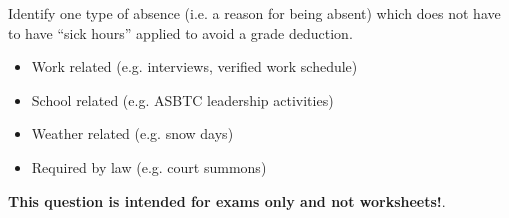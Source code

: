 

Identify one type of absence (i.e. a reason for being absent) which does not have to have ``sick hours'' applied to avoid a grade deduction.







\begin{itemize}
\item{} Work related (e.g. interviews, verified work schedule)
\item{} School related (e.g. ASBTC leadership activities)
\item{} Weather related (e.g. snow days)
\item{} Required by law (e.g. court summons)
\end{itemize}

 






{\bf This question is intended for exams only and not worksheets!}.



